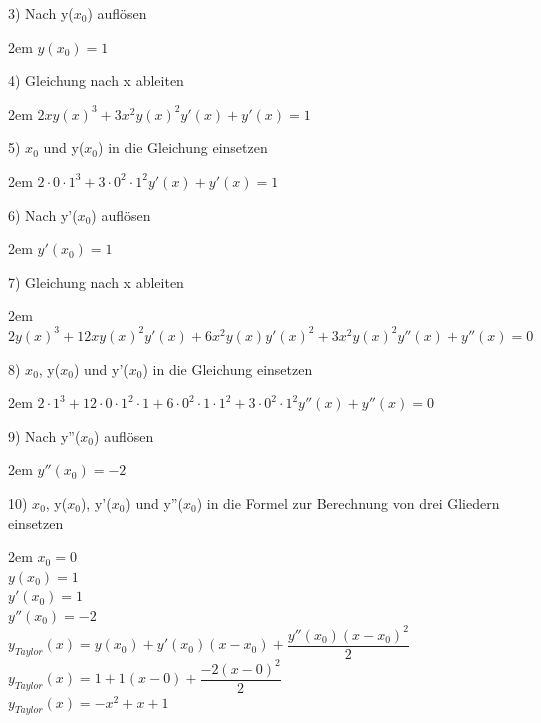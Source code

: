 \documentclass[11pt,final]{scrreprt}
\begin{document}
3) Nach y($x_0$) auflösen

\begingroup
\leftskip2em 
$ y(x_0) = 1$\\
\par	
\endgroup 

4) Gleichung nach x ableiten

\begingroup
\leftskip2em 
$ 2xy(x)^3+3x^2y(x)^2y'(x)+y'(x)=1 $
\par	
\endgroup 

5) $x_0$ und y($x_0$) in die Gleichung einsetzen

\begingroup
\leftskip2em 
$ 2\cdot0\cdot1^3+3\cdot0^2\cdot1^2y'(x)+y'(x)=1 $
\par	
\endgroup 

6) Nach y'($x_0$) auflösen

\begingroup
\leftskip2em 
$ y'(x_0) = 1$\\
\par	
\endgroup 

7) Gleichung nach x ableiten

\begingroup
\leftskip2em 
$ 2y(x)^3 + 12xy(x)^2y'(x)+6x^2y(x)y'(x)^2+3x^2y(x)^2y''(x)+y''(x) = 0 $
\par	
\endgroup 

8) $x_0$, y($x_0$) und y'($x_0$) in die Gleichung einsetzen

\begingroup
\leftskip2em 
$ 2\cdot1^3 + 12\cdot0\cdot1^2\cdot1+6\cdot0^2\cdot1\cdot1^2+3\cdot0^2\cdot1^2y''(x)+y''(x) = 0 $
\par	
\endgroup 

9) Nach y''($x_0$) auflösen

\begingroup
\leftskip2em 
$ y''(x_0) = -2 $\\
\par	
\endgroup 

10) $x_0$, y($x_0$), y'($x_0$) und y''($x_0$) in die Formel zur Berechnung von drei Gliedern einsetzen

\begingroup
\leftskip2em 
$ x_0 = 0$\\
$y(x_0) = 1$\\
$y'(x_0)=1 $\\
$y''(x_0) = -2 $\\
$ y_{Taylor}(x) = y(x_0)+y'(x_0)(x-x_0)+\dfrac{y''(x_0)(x-x_0)^2}{2} $\\
$ y_{Taylor}(x) = 1+1(x-0)+\dfrac{-2(x-0)^2}{2} $\\
$ y_{Taylor}(x) = -x^2+x+1$\\
\par	
\endgroup 
\end{document}
